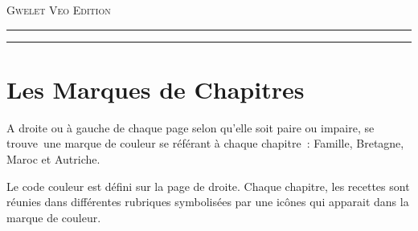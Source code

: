 \documentclass[twoside]{article}
\makeatletter
\newif\if@mainmatter \@mainmattertrue
\newcommand\frontmatter{%
    \cleardoublepage
  \@mainmatterfalse
  \pagenumbering{roman}}
\makeatother
\begin{document}
\begin{titlepage}
	{\large\textsc{Gwelet Veo Edition}} %
	
	\vspace{0.1\textheight} %
	
	\color{black}
	\rule{\textwidth}{0.4pt} %
	
	\vspace{2pt}\vspace{-\baselineskip} %
	
	\rule{\textwidth}{1pt} %
	
\end{titlepage}

\clearpage %
\begingroup
  \pagestyle{empty}
  \null
  \newpage
\endgroup

\frontmatter



\newpage
\fancyhead{} %
\fancyhead[LE]{\bfseries\nouppercase{\leftmark}}      %
\fancyhead[RO]{\bfseries\nouppercase{\leftmark}}      %
\tableofcontents

\newpage
\fancyhead{}
\fancyhead[RO]{\bfseries\nouppercase{\leftmark}}      %

\section*{Les Marques de Chapitres}
A droite ou à gauche de chaque page selon qu’elle soit paire ou impaire, se trouve une marque de couleur se référant 
à chaque chapitre : Famille, Bretagne, Maroc et Autriche.

Le code couleur est défini sur la page de droite.
Chaque chapitre, les recettes sont réunies dans différentes rubriques symbolisées par une icônes qui apparait dans la marque de couleur.
\end{document}
